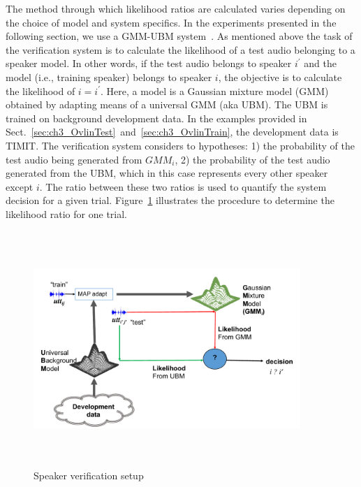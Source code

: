 The method through which likelihood ratios are calculated varies depending on the choice of model and system specifics. 
In the experiments presented in the following section, we use a GMM-UBM system~\cite{reynolds_map}. 
As mentioned above the task of the verification system is to calculate the likelihood of a test audio belonging to a speaker model. 
In other words, if the test audio belongs to speaker $i^\prime$ and the model (i.e., training speaker) belongs to speaker $i$, the objective is to calculate the likelihood of $i=i^\prime$. 
Here, a model is a Gaussian mixture model (GMM) obtained by adapting means of a universal GMM (aka UBM). 
The UBM is trained on background development data. 
In the examples provided in Sect.~\ref{sec:ch3_OvlinTest}~and~\ref{sec:ch3_OvlinTrain}, the development data is TIMIT. 
The verification system considers to hypotheses: 1) the probability of the test audio being generated from $GMM_i$, 2) the probability of the test audio generated from the UBM, which in this case represents every other speaker except $i$. 
The ratio between these two ratios is used to quantify the system decision for a given trial. 
Figure~\ref{fig:ch3_gmm_ubm_sid} illustrates the procedure to determine the likelihood ratio for one trial. 

\begin{figure}[h!]
	\centering
	\vspace{0mm}
	\includegraphics[height = 3.5in, width=0.9\textwidth]{figures/gmm_ubm_sid_setup}
	\vspace{-3mm}
	\caption{ Speaker verification setup}
	\label{fig:ch3_gmm_ubm_sid}
	\vspace{0mm}
\end{figure}

